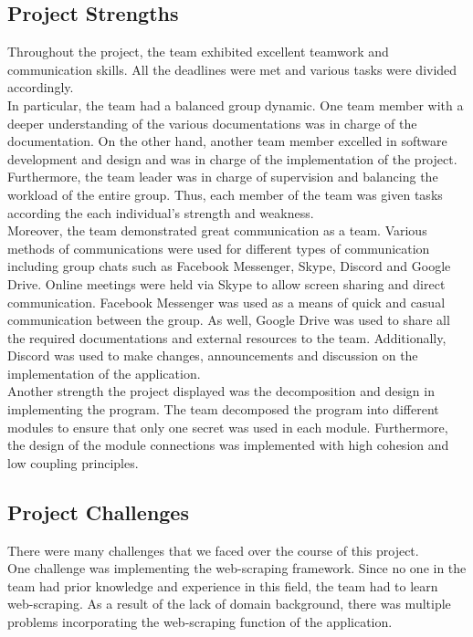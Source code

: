 \documentclass{article}
\begin{document}
\subsection{Project Strengths}
\hspace{5mm} Throughout the project, the team exhibited excellent teamwork and communication skills. All the deadlines were met and various tasks were divided accordingly. \\


In particular, the team had a balanced group dynamic. One team member with a deeper understanding of the various documentations was in charge of the documentation. On the other hand, another team member excelled in software development and design and was in charge of the implementation of the project. Furthermore, the team leader was in charge of supervision and balancing the workload of the entire group. Thus, each member of the team was given tasks according the each individual's strength and weakness. \\

Moreover, the team demonstrated great communication as a team. Various methods of communications were used for different types of communication including group chats such as Facebook Messenger, Skype, Discord and Google Drive. Online meetings were held via Skype to allow screen sharing and direct communication. Facebook Messenger was used as a means of quick and casual communication between the group. As well, Google Drive was used to share all the required documentations and external resources to the team. Additionally, Discord was used to make changes, announcements and discussion on the implementation of the application.\\


Another strength the project displayed was the decomposition and design in implementing the program. The team decomposed the program into different modules to ensure that only one secret was used in each module. Furthermore, the design of the module connections was implemented with high cohesion and low coupling principles.
\subsection{Project Challenges}
\hspace{5mm}There were many challenges that we faced over the course of this project. \\


One challenge was implementing the web-scraping framework. Since no one in the team had prior knowledge and experience in this field, the team had to learn web-scraping. As a result of the lack of domain background, there was multiple problems incorporating the web-scraping function of the application.\\
\end{document}
